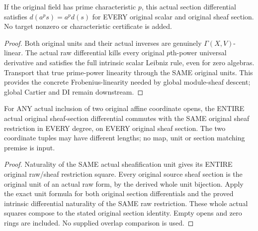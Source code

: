 \begin{lemma}
\label{lem:cartier-original-affine-section-power-linearity}
\leanok
If the original field has prime characteristic $p$, this actual
section differential satisfies $d(a^p s)=a^p d(s)$ for EVERY
original scalar and original sheaf section. No target nonzero or
characteristic certificate is added.
\end{lemma}
\begin{proof}
Both original units and their actual inverses are genuinely
$\Gamma(X,V)$-linear. The actual raw differential kills every
original $p$th-power universal derivative and satisfies the full
intrinsic scalar Leibniz rule, even for zero algebras. Transport
that true prime-power linearity through the SAME original units.
This provides the concrete Frobenius-linearity needed by global
module-sheaf descent; global Cartier and DI remain downstream.
\end{proof}

\begin{theorem}
\label{thm:cartier-original-affine-section-differential-naturality}
\leanok
For ANY actual inclusion of two original affine coordinate opens,
the ENTIRE actual original sheaf-section differential commutes
with the SAME original sheaf restriction in EVERY degree, on
EVERY original sheaf section. The two coordinate tuples may have
different lengths; no map, unit or section matching premise is input.
\end{theorem}
\begin{proof}
Naturality of the SAME actual sheafification unit gives its ENTIRE
original raw/sheaf restriction square. Every original source sheaf
section is the original unit of an actual raw form, by the derived
whole unit bijection. Apply the exact unit formula for both original
section differentials and the proved intrinsic differential
naturality of the SAME raw restriction. These whole actual squares
compose to the stated original section identity. Empty opens and
zero rings are included. No supplied overlap comparison is used.
\end{proof}
